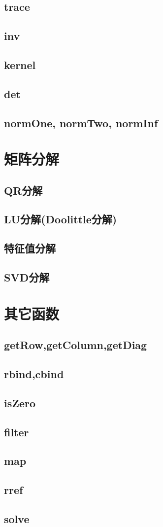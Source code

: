 \documentclass[UTF8]{ctexart}
\begin{document}
\subsection{trace}
\subsection{inv}
\subsection{kernel}
\subsection{det}
\subsection{normOne, normTwo, normInf}

\section{矩阵分解}
\subsection{QR分解}
\subsection{LU分解(Doolittle分解)}
\subsection{特征值分解}
\subsection{SVD分解}

\section{其它函数}
\subsection{getRow,getColumn,getDiag}
\subsection{rbind,cbind}
\subsection{isZero}
\subsection{filter}
\subsection{map}
\subsection{rref}
\subsection{solve}
\end{document}
